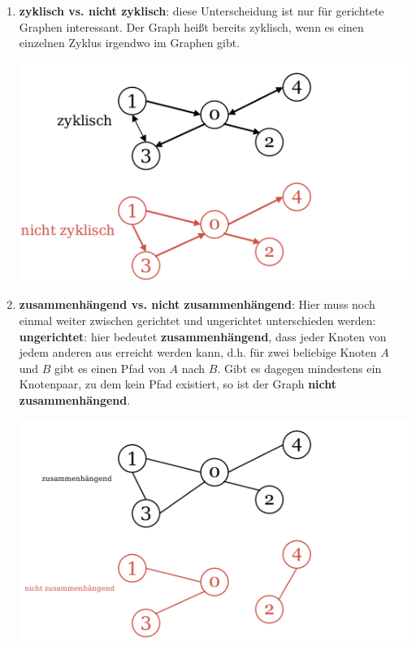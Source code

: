 \documentclass{article}
\begin{document}
\begin{enumerate}
\begin{center}
    \end{center}
    \item \textbf{zyklisch vs. nicht zyklisch}: diese Unterscheidung ist nur für gerichtete Graphen interessant. Der Graph heißt bereits zyklisch, wenn es einen einzelnen Zyklus irgendwo im Graphen gibt.\begin{center}
        \includegraphics[scale=0.15]{../../media/zyklisch.png}
    \end{center}
    \item \textbf{zusammenhängend vs. nicht zusammenhängend}: Hier muss noch einmal weiter zwischen gerichtet und ungerichtet unterschieden werden: \\
    \textbf{ungerichtet}: hier bedeutet \textbf{zusammenhängend}, dass jeder Knoten von jedem anderen aus erreicht werden kann, d.h. für zwei beliebige Knoten $A$ und $B$ gibt es einen Pfad von $A$ nach $B$. Gibt es dagegen mindestens ein Knotenpaar, zu dem kein Pfad existiert, so ist der Graph \textbf{nicht zusammenhängend}. \begin{center}
        \includegraphics[scale=0.15]{../../media/ungerichtet_zusammenhang.png}

\end{center}
\end{enumerate}
\end{document}
